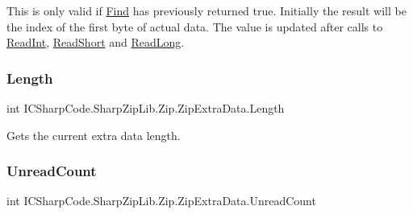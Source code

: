 This is only valid if \hyperlink{class_i_c_sharp_code_1_1_sharp_zip_lib_1_1_zip_1_1_zip_extra_data_a91e0c6c1d11967653256ccb161f9818c}{Find} has previously returned true. Initially the result will be the index of the first byte of actual data. The value is updated after calls to \hyperlink{class_i_c_sharp_code_1_1_sharp_zip_lib_1_1_zip_1_1_zip_extra_data_a77039b5fe5d0c56be598b5eadb669a62}{Read\+Int}, \hyperlink{class_i_c_sharp_code_1_1_sharp_zip_lib_1_1_zip_1_1_zip_extra_data_a13e4cefe2f4873f46fc93cc043852e57}{Read\+Short} and \hyperlink{class_i_c_sharp_code_1_1_sharp_zip_lib_1_1_zip_1_1_zip_extra_data_a06f9836c2c567c9f223810d3e2d9b51c}{Read\+Long}. \mbox{\label{class_i_c_sharp_code_1_1_sharp_zip_lib_1_1_zip_1_1_zip_extra_data_a4e9d9554243ef4e4712b4eb7b0a10ba9}} 
\subsubsection{\texorpdfstring{Length}{Length}}
{\footnotesize\ttfamily int I\+C\+Sharp\+Code.\+Sharp\+Zip\+Lib.\+Zip.\+Zip\+Extra\+Data.\+Length\hspace{0.3cm}{\ttfamily [get]}}



Gets the current extra data length. 

\mbox{\label{class_i_c_sharp_code_1_1_sharp_zip_lib_1_1_zip_1_1_zip_extra_data_a9d45dc3d898302d0fcff35e6960edccc}} 
\subsubsection{\texorpdfstring{Unread\+Count}{UnreadCount}}
{\footnotesize\ttfamily int I\+C\+Sharp\+Code.\+Sharp\+Zip\+Lib.\+Zip.\+Zip\+Extra\+Data.\+Unread\+Count\hspace{0.3cm}{\ttfamily [get]}}



